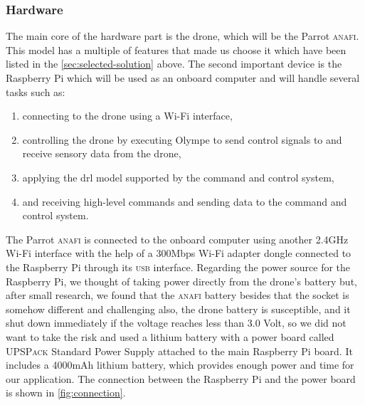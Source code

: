 \documentclass[../main.tex]{subfiles}
\begin{document}
\subsubsection{Hardware}
The main core of the hardware part is the drone, 
which will be the Parrot \textsc{anafi}. This model 
has a multiple of features that made us choose it 
which have been listed in the 
\cref{sec:selected-solution} above. 
The second important device is the Raspberry Pi 
which will be used as an onboard computer and will 
handle several tasks such as:

\begin{enumerate}
    \item connecting to the drone 
        using a Wi-Fi interface,
    \item controlling the drone 
        by executing Olympe to send control signals 
        to and receive sensory data from the drone,
    \item applying the \gls{drl} model supported by 
        the command and control system,
    \item and receiving high-level commands and 
        sending data to the command and control system.
\end{enumerate}
 
The Parrot \textsc{anafi} is connected 
to the onboard computer using another 
2.4GHz Wi-Fi interface with the help of a 
300Mbps Wi-Fi adapter dongle connected to 
the Raspberry Pi through its \textsc{usb} interface. 
Regarding the power source for the Raspberry Pi, we thought of taking power directly from the drone's battery but, after small research, we found that the \textsc{anafi} battery besides that the socket is somehow different and challenging also, the drone battery is susceptible, and it shut down immediately if the voltage reaches less than 3.0 Volt, so we did not want to take the risk and used a 
lithium battery with a power board called 
\textsc{UPSPack} Standard Power Supply attached to 
the main Raspberry Pi board. It includes a 4000mAh 
lithium battery, which provides enough power 
and time for our application.
The connection between the Raspberry Pi and 
the power board is shown in \cref{fig:connection}.
\end{document}
